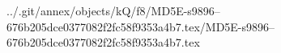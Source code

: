../.git/annex/objects/kQ/f8/MD5E-s9896--676b205dce0377082f2fc58f9353a4b7.tex/MD5E-s9896--676b205dce0377082f2fc58f9353a4b7.tex